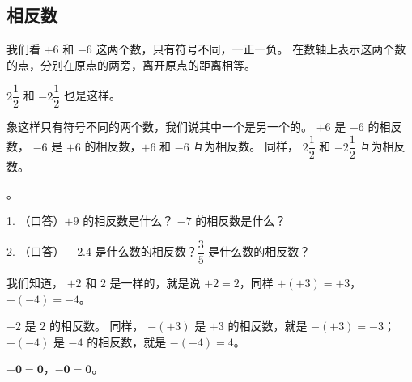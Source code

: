 \subsection{相反数}\label{subsec:1-3}

我们看 $+6$ 和 $-6$ 这两个数，只有符号不同，一正一负。
在数轴上表示这两个数的点，分别在原点的两旁，离开原点的距离相等。

$2\dfrac{1}{2}$ 和 $-2\dfrac{1}{2}$ 也是这样。

象这样只有符号不同的两个数，我们说其中一个是另一个的。
$+6$ 是 $-6$ 的相反数， $-6$ 是 $+6$ 的相反数，$+6$ 和 $-6$ 互为相反数。
同样， $2\dfrac{1}{2}$ 和 $-2\dfrac{1}{2}$ 互为相反数。

。


\lianxi

1. （口答）$+9$ 的相反数是什么？ $-7$ 的相反数是什么？

2. （口答） $-2.4$ 是什么数的相反数？$\dfrac{3}{5}$ 是什么数的相反数？

\vspace{2em}

我们知道， $+2$ 和 $2$ 是一样的，就是说 $+2 = 2$，同样 $+(+3) = +3$，$+(-4) = -4$。

$-2$ 是 $2$ 的相反数。 同样，
$-(+3)$ 是 $+3$ 的相反数，就是 $-(+3) = -3$；
$-(-4)$ 是 $-4$ 的相反数，就是 $-(-4) = 4$。


$\bm{+0 = 0}$，$\bm{-0 = 0}$。


\lianxi
\begin{xiaotis}



\end{xiaotis}

